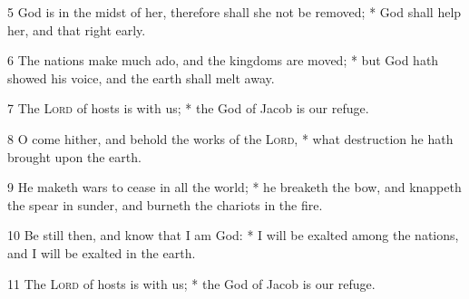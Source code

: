 5 God is in the midst of her, therefore shall she not be removed; * God shall help her, and that right early.\par
6 The nations make much ado, and the kingdoms are moved; * but God hath showed his voice, and the earth shall melt away.\par
7 The {\textsc{Lord}} of hosts is with us; * the God of Jacob is our refuge.\par
8 O come hither, and behold the works of the {\textsc{Lord}}, * what destruction he hath brought upon the earth.\par
9 He maketh wars to cease in all the world; * he breaketh the bow, and knappeth the spear in sunder, and burneth the chariots in the fire.\par
10 Be still then, and know that I am God: * I will be exalted among the nations, and I will be exalted in the earth.\par
11 The {\textsc{Lord}} of hosts is with us; * the God of Jacob is our refuge.
